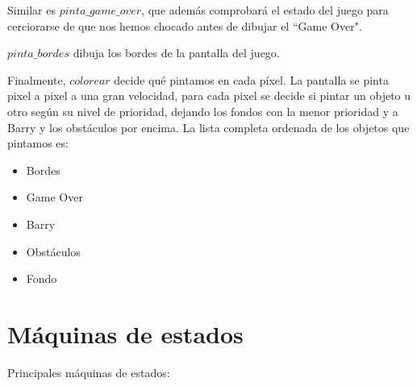 \documentclass[11pt, a4paper, spanish, openright, twoside]{book}
\begin{document}
Similar es $pinta\_game\_over$, que además comprobará el estado del juego para cerciorarse de que nos hemos chocado antes de dibujar el ``Game Over".

$pinta\_bordes$ dibuja los bordes de la pantalla del juego.

Finalmente, $colorear$ decide qué pintamos en cada píxel. La pantalla se pinta pixel a pixel a una gran velocidad, para cada pixel se decide si pintar un objeto u otro según su nivel de prioridad, dejando los fondos con la menor prioridad y a Barry y los obstáculos por encima. La lista completa ordenada de los objetos que pintamos es:
\begin{itemize}
	\item Bordes
	\item Game Over
	\item Barry
	\item Obstáculos
	\item Fondo
\end{itemize}

\section{Máquinas de estados}

Principales máquinas de estados:
\end{document}
